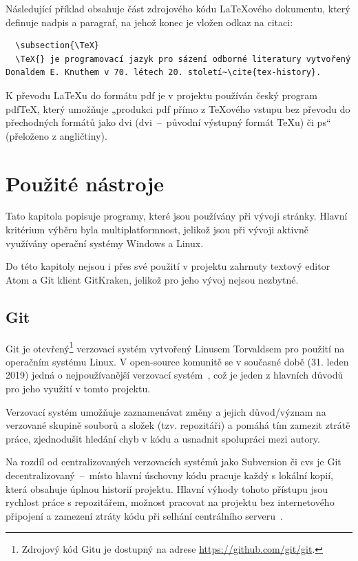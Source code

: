 \documentclass[a4paper, 12pt, twoside]{article}
\begin{document}
  Následující příklad obsahuje část zdrojového kódu \LaTeX ového dokumentu, který definuje nadpis a paragraf, na jehož konec je vložen odkaz na citaci:

  \begin{verbatim}
  \subsection{\TeX}
  \TeX{} je programovací jazyk pro sázení odborné literatury vytvořený Donaldem E. Knuthem v 70. létech 20. století~\cite{tex-history}.
  \end{verbatim}

  K převodu \LaTeX u do formátu \gls{pdf} je v projektu používán český program pdf\TeX, který umožňuje „produkci \gls{pdf} přímo z \TeX ového vstupu bez převodu do přechodných formátů jako \acrshort{dvi} (\acrlong{dvi}~--~původní výstupný formát \TeX u) či \gls{ps}“~\cite{pdftex} (přeloženo z angličtiny).


  \section{Použité nástroje} \label{sec:Použité nástroje}
  Tato kapitola popisuje programy, které jsou používány při vývoji stránky. Hlavní kritérium výběru byla multiplatformnost, jelikož jsou při vývoji aktivně využívány operační systémy Windows a Linux.

  Do této kapitoly nejsou i přes své použití v projektu zahrnuty textový editor Atom a Git klient GitKraken, jelikož pro jeho vývoj nejsou nezbytné.


  \subsection{Git} \label{sec:Git}
  Git je otevřený\footnote{Zdrojový kód Gitu je dostupný na adrese \url{https://github.com/git/git}.} verzovací systém vytvořený Linusem Torvaldsem pro použití na operačním systému Linux. V open-source komunitě se v současné době (31. leden 2019) jedná o nejpoužívanější verzovací systém~\cite{version-control-usage-statistics}, což je jeden z hlavních důvodů pro jeho využití v tomto projektu.

  Verzovací systém umožňuje zaznamenávat změny a jejich důvod/význam na verzované skupině souborů a složek (tzv. repozitáři) a pomáhá tím zamezit ztrátě práce, zjednodušit hledání chyb v kódu a usnadnit spolupráci mezi autory.

  Na rozdíl od centralizovaných verzovacích systémů jako Subversion či \gls{cvs} je Git decentralizovaný~--~místo hlavní úschovny kódu pracuje každý s lokální kopií, která obsahuje úplnou historií projektu. Hlavní výhody tohoto přístupu jsou rychlost práce s repozitářem, možnost pracovat na projektu bez internetového připojení a zamezení ztráty kódu při selhání centrálního serveru~\cite{cvcs-vs-dvcs}.
\end{document}
